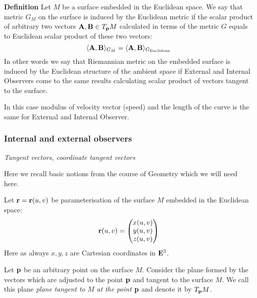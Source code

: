 \documentclass[12pt]{article}
\theoremstyle{theorem}
\numberwithin{equation}{section}
\begin{document}
 {\bf Definition}  Let $M$ be a surface embedded in the Euclidean space. 
We say that metric $G_M$ on the surface is
 induced by the Euclidean metric
if the scalar product of arbitrary two vectors ${\bf A,B}\in T_{\bf p} M$ calculated in terms of the metric $G$
equals to Euclidean scalar product of these two vectors:
          \begin{equation}\label{inducedmetric1}
      \langle{\bf A,B}\rangle_{G_M}=\langle{\bf A,B}\rangle_{G_{\rm Euclidean}}
          \end{equation}
In other words  we say that Riemannian metric on the embedded surface is induced by the Euclidean structure of the ambient space
    if External and Internal Observers come to the same results calculating scalar product of vectors tangent to the surface.

    In this case modulus of velocity vector (speed) and the length of the curve is the same for
    External and Internal Observer.



\subsubsection {Internal and external observers}



\centerline {\it Tangent vectors, coordinate 
tangent vectors}

Here we recall basic notions from the course of 
Geometry which we will need here.


    Let ${\bf r}={\bf r}(u,v)$ be parameterisation 
of the surface $M$ embedded in the Euclidean space:
                           \begin{equation*}
                            {\bf r}(u,v)=\begin{pmatrix}x(u,v)\cr
                              y(u,v)\cr
                              z(u,v)\cr
                              \end{pmatrix}
                           \end{equation*}
Here as always $x,y,z$ are Cartesian coordinates in ${\bf E}^3$.



Let ${\bf p}$ be an arbitrary point on the surface $M$.
Consider the plane formed by the vectors 
which are adjusted to the point ${\bf p}$
and tangent to the surface $M$. We call this plane
{\it plane tangent to $M$ at the point ${\bf p}$ } 
and denote it by $T_{\bf p} M$.
\end{document}
